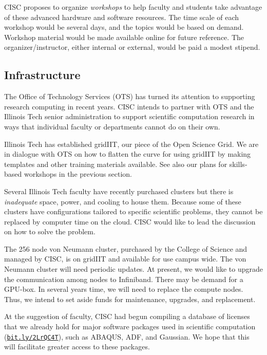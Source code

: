 \documentclass[12pt]{amsart}
\begin{document}
CISC proposes to organize \emph{workshops} to help faculty and students take advantage of these advanced hardware and software resources.  The time scale of each workshop would be several days, and the topics would be based on demand. Workshop material would be made available online for future reference.  The organizer/instructor, either internal or external, would be paid a modest stipend.

\subsection*{Infrastructure} The Office of Technology Services (OTS) has turned its attention to supporting research computing in recent years.  CISC intends to partner with OTS and the Illinois Tech senior administration to support scientific computation research in ways that individual faculty or departments cannot do on their own.

Illinois Tech has established gridIIT, our piece of the Open Science Grid.  We are in dialogue with OTS on how to flatten the curve for using gridIIT by making templates and other training materials available. See also our plans for skills-based workshops in the previous section.

Several Illinois Tech faculty have recently purchased clusters but there is \emph{inadequate} space, power, and cooling to house them.  Because some of these clusters have configurations tailored to specific scientific problems, they cannot be replaced by computer time on the cloud.  CISC would like to lead the discussion on how to solve the problem.

The 256 node von Neumann cluster, purchased by the College of Science and managed by CISC, is on gridIIT and available for use campus wide.  The von Neumann cluster will need periodic updates.  At present, we would like to upgrade the communication among nodes to Infiniband.  There may be demand for a GPU-box.  In several years time, we will need to replace the compute nodes.  Thus, we intend to set aside funds for maintenance, upgrades, and replacement.

At the suggestion of faculty, CISC had begun compiling a database of licenses that we already hold for major software packages used in scientific computation (\href{http://bit.ly/2LrQC4T}{\nolinkurl{bit.ly/2LrQC4T}}),  such as ABAQUS, ADF, and Gaussian.  We hope that this will facilitate greater access to these packages.
\end{document}
